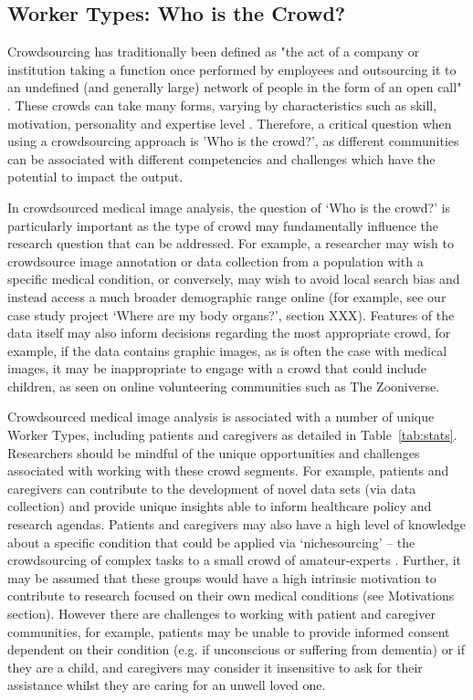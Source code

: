 \documentclass[10pt,twocolumn,letterpaper]{article}
\begin{document}
\subsection{Worker Types: Who is the Crowd?}
Crowdsourcing has traditionally been defined as "the act of a company or institution taking a function once performed by employees and outsourcing it to an undefined (and generally large) network of people in the form of an open call" \cite{howe2006rise}. These crowds can take many forms, varying by characteristics such as skill, motivation, personality and expertise level \cite{Kazai:2011:WTP:2063576.2063860, vuurens2011much, ross2010crowdworkers}. Therefore, a critical question when using a crowdsourcing approach is ’Who is the crowd?’, as different communities can be associated with different competencies and challenges which have the potential to impact the output.

In crowdsourced medical image analysis, the question of ‘Who is the crowd?’ is particularly important as the type of crowd may fundamentally influence the research question that can be addressed. For example, a researcher may wish to crowdsource image annotation or data collection from a population with a specific medical condition, or conversely, may wish to avoid local search bias and instead access a much broader demographic range online (for example, see our case study project ‘Where are my body organs?’, section XXX). Features of the data itself may also inform decisions regarding the most appropriate crowd, for example, if the data contains graphic images, as is often the case with medical images, it may be inappropriate to engage with a crowd that could include children, as seen on online volunteering communities such as The Zooniverse.

Crowdsourced medical image analysis is associated with a number of unique Worker Types, including patients and caregivers as detailed in Table~\ref{tab:stats}. Researchers should be mindful of the unique opportunities and challenges associated with working with these crowd segments. For example, patients and caregivers can contribute to the development of novel data sets (via data collection) and provide unique insights able to inform healthcare policy and research agendas. Patients and caregivers may also have a high level of knowledge about a specific condition that could be applied via ‘nichesourcing’ – the crowdsourcing of complex tasks to a small crowd of amateur-experts \cite{de2012nichesourcing}. Further, it may be assumed that these groups would have a high intrinsic motivation to contribute to research focused on their own medical conditions (see Motivations section). However there are challenges to working with patient and caregiver communities, for example, patients may be unable to provide informed consent dependent on their condition (e.g. if unconscious or suffering from dementia) or if they are a child, and caregivers may consider it insensitive to ask for their assistance whilst they are caring for an unwell loved one.
\end{document}
